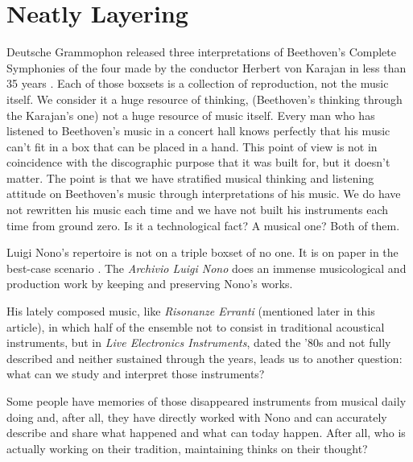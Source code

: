 \documentclass[twoside,a4paper]{article}
\begin{document}
\section{Neatly Layering}
\label{sec:layering}

Deutsche Grammophon released three interpretations of Beethoven's Complete
Symphonies of the four made by the conductor Herbert von Karajan in less than
35 years \cite{rrrnyt}. Each of those boxsets is a collection of reproduction,
not the music itself. We consider it a huge resource of thinking, (Beethoven's
thinking through the Karajan's one) not a huge resource of music itself. Every
man who has listened to Beethoven's music in a concert hall knows perfectly that
his music can't fit in a box that can be placed in a hand. This point of view is
not in coincidence with the discographic purpose that it was built for, but it
doesn't matter. The point is that we have stratified musical thinking and
listening attitude on Beethoven's music through interpretations of his music.
We do have not rewritten his music each time and we have not built his instruments
each time from ground zero. Is it a technological fact? A musical one? Both of
them.

Luigi Nono's repertoire is not on a triple boxset of no one. It is on paper in
the best-case scenario \cite{raprmt}. The \emph{Archivio Luigi Nono} does an
immense musicological and production work by keeping and preserving Nono's works.

His lately composed music, like \emph{Risonanze Erranti} (mentioned later in this
article), in which half of the ensemble not to consist in traditional acoustical
instruments, but in \emph{Live Electronics Instruments}, dated the '80s and not
fully described and neither sustained through the years, leads us to another
question: what can we study and interpret those instruments?


Some people have memories of those disappeared instruments from musical daily
doing and, after all, they have directly worked with Nono and can accurately
describe and share what happened and what can today happen. After all, who is
actually working on their tradition, maintaining thinks on their thought?
\end{document}
